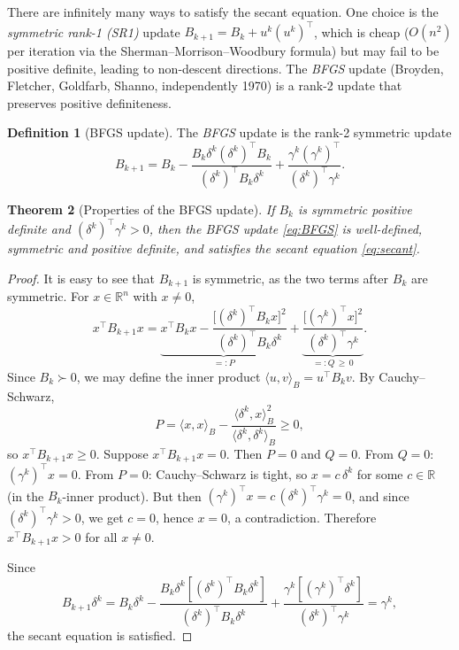 \documentclass[11pt,a4paper]{report}
\theoremstyle{plain}
\newtheorem{theorem}{Theorem}[chapter]
\theoremstyle{definition}
\newtheorem{definition}[theorem]{Definition}
\newcommand{\R}{\mathbb{R}}
\newcommand{\trans}{^{\top}}
\begin{document}
There are infinitely many ways to satisfy the secant equation. One choice is the
\emph{symmetric rank-1 (SR1)} update $B_{k+1}=B_{k}+u^{k}(u^{k})\trans$, which is
cheap ($O(n^{2})$ per iteration via the Sherman--Morrison--Woodbury formula) but
may fail to be positive definite, leading to non-descent directions.
The \emph{BFGS} update (Broyden, Fletcher, Goldfarb, Shanno, independently 1970)
is a rank-2 update that preserves positive definiteness.

\begin{definition}[BFGS update]
The \emph{BFGS} update is the rank-2 symmetric update
\begin{equation}\label{eq:BFGS}
B_{k+1}=B_{k}-\frac{B_{k}\delta^{k}(\delta^{k})\trans B_{k}}{(\delta^{k})\trans B_{k}\delta^{k}}
+\frac{\gamma^{k}(\gamma^{k})\trans}{(\delta^{k})\trans\gamma^{k}}.
\end{equation}
\end{definition}

\begin{theorem}[Properties of the BFGS update]\label{thm:BFGS-pd}
If $B_{k}$ is symmetric positive definite and $(\delta^{k})\trans\gamma^{k}>0$,
then the BFGS update \eqref{eq:BFGS} is well-defined, symmetric and positive
definite, and satisfies the secant equation \eqref{eq:secant}.
\end{theorem}
\begin{proof}
  It is easy to see that $B_{k + 1}$ is symmetric, as the two terms after $B_k$ are symmetric. For $x \in \R^n$ with $x \neq 0$, 
  \[
    x\trans B_{k+1} x = \underbrace{x\trans B_{k}x - \frac{\bigl[(\delta^{k})\trans B_{k} x\bigr]^2}{(\delta^{k})\trans B_{k}\delta^{k}}}_{=:P}
    +\underbrace{\frac{\bigl[(\gamma^{k})\trans x\bigr]^2}{(\delta^{k})\trans\gamma^{k}}}_{=:Q\,\ge\,0}.
  \]
  Since $B_k\succ 0$, we may define the inner product $\langle u, v \rangle_B = u\trans B_k v$. By Cauchy--Schwarz,
  \[
    P = \langle x, x \rangle_B - \frac{\langle \delta^k, x \rangle_B^2}{\langle \delta^k, \delta^k \rangle_B} \geq 0,
  \]
  so $x\trans B_{k+1}x\ge 0$. Suppose $x\trans B_{k+1}x=0$. Then $P=0$ and $Q=0$. From $Q=0$: $(\gamma^{k})\trans x=0$. From $P=0$: Cauchy--Schwarz is tight, so $x=c\,\delta^{k}$ for some $c\in\R$ (in the $B_k$-inner product). But then $(\gamma^{k})\trans x=c\,(\delta^{k})\trans\gamma^{k}=0$, and since $(\delta^{k})\trans\gamma^{k}>0$, we get $c=0$, hence $x=0$, a contradiction. Therefore $x\trans B_{k+1}x>0$ for all $x\ne 0$.

  Since
  \[
    B_{k + 1}\delta^k = B_k\delta^k - \frac{B_k\delta^k[(\delta^k)\trans B_k\delta^k]}{(\delta^k)\trans B_k\delta^k} + \frac{\gamma^k[(\gamma^k)\trans\delta^k]}{(\delta^k)\trans\gamma^k} = \gamma^k,
  \]
  the secant equation is satisfied.
\end{proof}
\end{document}
